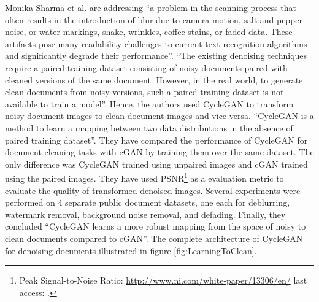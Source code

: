 Monika Sharma et al.\cite{sharma2019learning} are addressing ``a problem in the scanning process that often results in the introduction of blur due to camera motion, salt and pepper noise, or water markings, shake, wrinkles, coffee stains, or faded data. These artifacts pose many readability challenges to current text recognition algorithms and significantly degrade their performance''\cite{sharma2019learning}. ``The existing denoising techniques require a paired training dataset consisting of noisy documents paired with cleaned versions of the same document. However, in the real world, to generate clean documents from noisy versions, such a paired training dataset is not available to train a model''\cite{zhu2020unpaired}\cite{sharma2019learning}. Hence, the authors used \ac{CycleGAN} to transform noisy document images to clean document images and vice versa\cite{zhu2020unpaired}. ``\ac{CycleGAN} is a method to learn a mapping between two data distributions in the absence of paired training dataset''\cite{zhu2020unpaired}\cite{sharma2019learning}. They have compared the performance of \ac{CycleGAN} for document cleaning tasks with \ac{cGAN} by training them over the same dataset. The only difference was \ac{CycleGAN} trained using unpaired images and \ac{cGAN} trained using the paired images. They have used \ac{PSNR}\footnote{Peak Signal-to-Noise Ratio: \url{http://www.ni.com/white-paper/13306/en/} last access: \dcdate.} as a evaluation metric to evaluate the quality of transformed denoised images. Several experiments were performed on 4 separate public document datasets, one each for deblurring, watermark removal, background noise removal, and defading. Finally, they concluded ``\ac{CycleGAN} learns a more robust mapping from the space of noisy to clean documents compared to \ac{cGAN}''\cite{sharma2019learning}. The complete architecture of \ac{CycleGAN} for denoising documents illustrated in figure \ref{fig:LearningToClean}.


